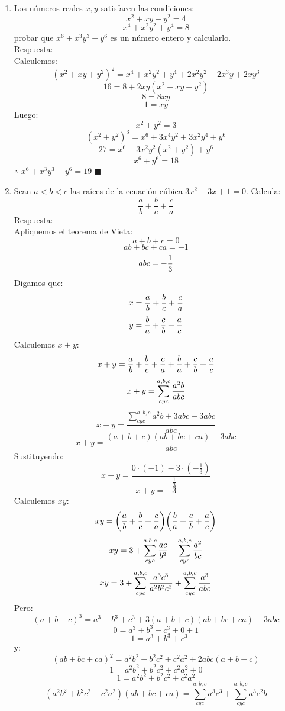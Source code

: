 \documentclass{book}
\begin{document}
\begin{enumerate}
No se cumple.\\
Para $c=0$:
$$a^3+c=a^2 c+a$$
$$a^3+0=a$$
$$a(a-1)(a+1)=0$$
Ya vimos que para $a=0$ no se cumple. Luego $a=\pm 1$.\\
Ahora nos falta por analizar cuando $c(a+b+c)=2$,$b(a+b+c)=2$ y $a(a+b+c)=2$:
$$c(a+b+c)=a(a+b+c)=b(a+b+c)$$
$$a=b=c$$
$$a=\pm\frac{\sqrt{3}}{3}$$
Pero en este caso no se cumple.\\
$\therefore$ Las soluciones son $(a;b;c)$:
$$\bigg(\pm\frac{\sqrt{3}}{3};\pm\frac{\sqrt{3}}{3};\pm\frac{\sqrt{3}}{3}\bigg)$$
$$(\pm 1; \pm 1;0)$$
$$(\pm 1;0;\pm 1)$$
$$(0;\pm 1;\pm 1)\;\blacksquare$$ \\
				\item Los números reales $x,y$ satisfacen las condiciones: 
				$$x^2+xy+y^2=4$$
				$$x^4+x^2y^2+y^4=8$$
				probar que $x^6 + x^3y^3 + y^6$ es un número entero y calcularlo.\\
				Respuesta:\\
				Calculemos:
$${( x^2  + xy + y^2 )}^2=x^4  +x^2 y^2  +y^4+2x^2 y^2+2x^3 y+2xy^3$$
$$16=8+2xy( x^2  + xy + y^2  )$$
$$8=8xy$$
$$1=xy$$
Luego:
$$ x^2   + y^2=3$$
$${(x^2 + y^2 )}^3=x^6+3x^4 y^2+3x^2 y^4+y^6$$
$$27=x^6+3x^2 y^2 (x^2+y^2 )+y^6$$
$$x^6   + y^6=18$$
$\therefore$ $x^6  + x^3 y^3  + y^6=19$ $\blacksquare$\\
				\item Sean $a < b < c$ las raíces de la ecuación cúbica $3x^2-3x+1=0$. Calcula: 
				$$\frac{a}{b}+\frac{b}{c}+\frac{c}{a}$$
				Respuesta:\\
				Apliquemos el teorema de Vieta:
$$a+b+c=0$$
$$ab+bc+ca=-1$$
$$abc=-{1\over 3}$$
Digamos que:
$$x={a\over b}+{b\over c}+{c\over a}$$
$$y={b\over a}+{c\over b}+{a\over c}$$
Calculemos $x+y$:
$$x+y={a\over b}+{b\over c}+{c\over a}+{b\over a}+{c\over b}+{a\over c}$$
$$x+y=\sum_{cyc}^{a,b,c}{a^2 b\over abc}$$
$$x+y=\frac{\sum_{cyc}^{a,b,c}a^2 b+3abc-3abc}{abc}$$
$$x+y=\frac{(a+b+c)(ab+bc+ca)-3abc}{abc}$$
Sustituyendo:
$$x+y=\frac{0\cdot(-1)-3\cdot(-\frac{1}{3})}{-\frac{1}{3}}$$
$$x+y=-3$$
Calculemos $xy$:
$$xy=\bigg({a\over b}+{b\over c}+{c\over a}\bigg)\bigg({b\over a}+{c\over b}+{a\over c}\bigg)$$
$$xy=3+\sum_{cyc}^{a,b,c}{ac\over b^2} +\sum_{cyc}^{a,b,c}{ a^2\over bc}$$
$$xy=3+\sum_{cyc}^{a,b,c}\frac{a^3 c^3}{a^2 b^2 c^2}+\sum_{cyc}^{a,b,c}{ a^3\over abc}$$
Pero:
$${(a+b+c)}^3=a^3+b^3+c^3+3(a+b+c)(ab+bc+ca)-3abc$$
$$0=a^3+b^3+c^3+0+1$$
$$-1=a^3+b^3+c^3$$
y:
$${(ab+bc+ca)}^2=a^2 b^2+b^2 c^2+c^2 a^2+2abc(a+b+c)$$
$$1=a^2 b^2+b^2 c^2+c^2 a^2+0$$
$$1=a^2 b^2+b^2 c^2+c^2 a^2$$
$$(a^2 b^2+b^2 c^2+c^2 a^2 )(ab+bc+ca)=\sum_{cyc}^{a,b,c}a^3 c^3+\sum_{cyc}^{a,b,c}a^3 c^2  b$$

\end{enumerate}
\end{document}
